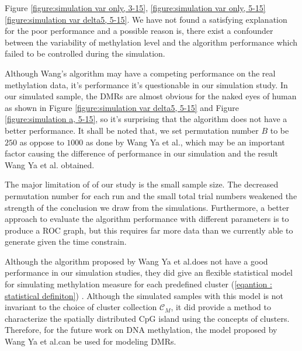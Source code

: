 \documentclass{report}
\begin{document}
 Figure \ref{figure:simulation var only, 3-15}, \ref{figure:simulation var only, 5-15} \ref{figure:simulation var delta5, 5-15}.
 We have not found a satisfying explanation for the poor performance and a possible reason is, there exist a confounder between the variability of methylation level and the algorithm performance which failed to be controlled during the simulation.
 \par
Although Wang's algorithm may have a competing performance on the real methylation data, it's performance it's questionable in our simulation study. In our simulated sample, the DMRs are almost obvious for the naked eyes of human as shown in Figure \ref{figure:simulation var delta5, 5-15} and Figure \ref{figure:simulation a, 5-15}, so it's surprising that the algorithm does not have a better performance. It shall be noted that, we set permutation number $B$ to be $250$ as oppose to $1000$ as done by Wang Ya et al.\cite{wang2017accounting}, which may be an important factor causing the difference of performance in our simulation and the result Wang Ya et al. obtained.
\par
The major limitation of of our study is the small sample size. The decreased permutation number for each run and the small total trial numbers weakened the strength of the conclusion we draw from the simulations. Furthermore, a better approach to evaluate the algorithm performance with different parameters 
is to produce a ROC graph, but this requires far more data than we currently able to generate given the time constrain.
\par
Although the algorithm proposed by Wang Ya et al.does not have a good performance in our simulation studies, they did give an flexible statistical model for simulating methylation measure for each predefined cluster (\ref{eqantion : statistical definiton}) \cite{wang2017accounting}. Although the simulated samples with this model is not invariant to the choice of cluster collection $\mathcal{C}_M$, it did provide a method to characterize the spatially distributed CpG island using the concepts of clusters. Therefore, for the future work on DNA methylation, the model proposed by Wang Ya et al.can be used for modeling DMRs.
\end{document}
